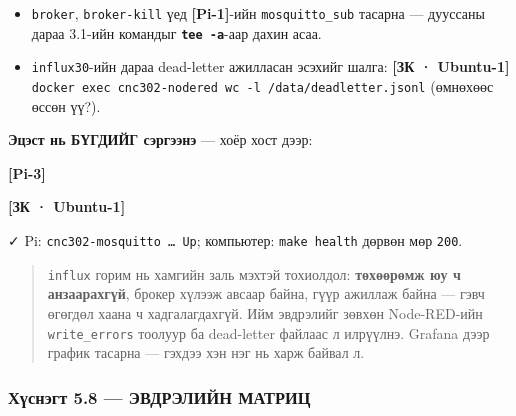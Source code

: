 \begin{itemize}
\tightlist
\item
  \texttt{broker}, \texttt{broker-kill} үед \textbf{{[}Pi-1{]}}-ийн \texttt{mosquitto\_sub} тасарна --- дууссаны дараа 3.1-ийн командыг \textbf{\texttt{tee\ -a}}-аар дахин асаа.
\item
  \texttt{influx30}-ийн дараа dead-letter ажилласан эсэхийг шалга: \textbf{{[}ЗК · Ubuntu-1{]}} \texttt{docker\ exec\ cnc302-nodered\ wc\ -l\ /\allowbreak{}data/\allowbreak{}deadletter.\allowbreak{}jsonl} (өмнөхөөс өссөн үү?).
\end{itemize}

\textbf{Эцэст нь БҮГДИЙГ сэргээнэ} --- хоёр хост дээр:

\textbf{{[}Pi-3{]}}

\begin{Shaded}
\begin{Highlighting}[]
\end{Highlighting}
\end{Shaded}

\textbf{{[}ЗК · Ubuntu-1{]}}

\begin{Shaded}
\begin{Highlighting}[]
\KeywordTok{\&\&} \KeywordTok{\&\&} 
\end{Highlighting}
\end{Shaded}

✓ Pi: \texttt{cnc302-mosquitto\ \ldots{}\ Up}; компьютер: \texttt{make\ health} дөрвөн мөр \texttt{200}.

\begin{quote}
\texttt{influx} горим нь хамгийн заль мэхтэй тохиолдол: \textbf{төхөөрөмж юу ч анзаарахгүй}, брокер хүлээж авсаар байна, гүүр ажиллаж байна --- гэвч өгөгдөл хаана ч хадгалагдахгүй. Ийм эвдрэлийг зөвхөн Node-RED-ийн \texttt{write\_errors} тоолуур ба dead-letter файлаас л илрүүлнэ. Grafana дээр график тасарна --- гэхдээ хэн нэг нь харж байвал л.
\end{quote}

\hypertarget{ux445ux4afux441ux43dux44dux433ux442-5.8-ux44dux432ux434ux440ux44dux43bux438ux439ux43d-ux43cux430ux442ux440ux438ux446}{%
\subsubsection{Хүснэгт 5.8 --- ЭВДРЭЛИЙН МАТРИЦ}\label{ux445ux4afux441ux43dux44dux433ux442-5.8-ux44dux432ux434ux440ux44dux43bux438ux439ux43d-ux43cux430ux442ux440ux438ux446}}

